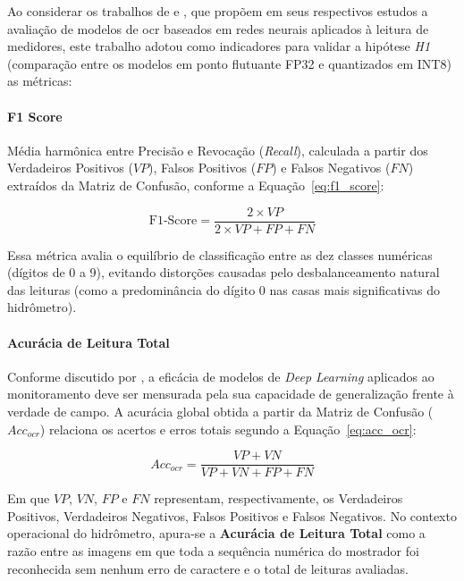 Ao considerar os trabalhos de  e
, que propõem em seus respectivos estudos a
avaliação de modelos de \gls{ocr} baseados em redes neurais aplicados à leitura
de medidores, este trabalho adotou como indicadores para validar a hipótese
\textit{H1} (comparação entre os modelos em ponto flutuante FP32 e
quantizados em INT8) as métricas:

\paragraph{F1 Score}
Média harmônica entre Precisão e Revocação (\textit{Recall}), calculada a
partir dos Verdadeiros Positivos ($VP$), Falsos Positivos ($FP$) e Falsos
Negativos ($FN$) extraídos da Matriz de Confusão, conforme a
Equação~\eqref{eq:f1_score}:

\begin{equation}
    \label{eq:f1_score}
    \text{F1-Score} = \frac{2 \times VP}{2 \times VP + FP + FN}
\end{equation}

Essa métrica avalia o equilíbrio de classificação entre as dez classes
numéricas (dígitos de 0 a 9), evitando distorções causadas pelo
desbalanceamento natural das leituras (como a predominância do dígito 0 nas
casas mais significativas do hidrômetro).

\paragraph{Acurácia de Leitura Total}
Conforme discutido por , a eficácia de modelos de
\textit{Deep Learning} aplicados ao monitoramento deve ser mensurada pela sua
capacidade de generalização frente à verdade de campo. A acurácia global obtida
a partir da Matriz de Confusão ($Acc_{ocr}$) relaciona os acertos e erros
totais segundo a Equação~\eqref{eq:acc_ocr}:

\begin{equation}
    \label{eq:acc_ocr}
    Acc_{ocr} = \frac{VP + VN}{VP + VN + FP + FN}
\end{equation}

Em que $VP$, $VN$, $FP$ e $FN$ representam, respectivamente, os Verdadeiros
Positivos, Verdadeiros Negativos, Falsos Positivos e Falsos Negativos. No
contexto operacional do hidrômetro, apura-se a \textbf{Acurácia de Leitura
Total} como a razão entre as imagens em que toda a sequência numérica do
mostrador foi reconhecida sem nenhum erro de caractere e o total de leituras
avaliadas.

